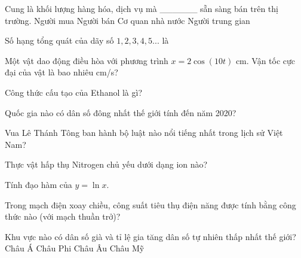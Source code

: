 \begin{ex}
    Cung là khối lượng hàng hóa, dịch vụ mà ______ sẵn sàng bán trên thị trường.
    \choice
    {Người mua}
    {\True Người bán}
    {Cơ quan nhà nước}
    {Người trung gian}
\end{ex}
\begin{ex}
    Số hạng tổng quát của dãy số $1, 2, 3, 4, 5...$ là
\end{ex}
\begin{ex}
    Một vật dao động điều hòa với phương trình $x = 2\cos(10t)$ cm. Vận tốc cực đại của vật là bao nhiêu cm/s?
\end{ex}
\begin{ex}
    Công thức cấu tạo của Ethanol là gì?
\end{ex}
\begin{ex}
    Quốc gia nào có dân số đông nhất thế giới tính đến năm 2020?
\end{ex}
\begin{ex}
    Vua Lê Thánh Tông ban hành bộ luật nào nổi tiếng nhất trong lịch sử Việt Nam?
\end{ex}
\begin{ex}
    Thực vật hấp thụ Nitrogen chủ yếu dưới dạng ion nào?
\end{ex}
\begin{ex}
    Tính đạo hàm của $y = \ln x$.
\end{ex}
\begin{ex}
    Trong mạch điện xoay chiều, công suất tiêu thụ điện năng được tính bằng công thức nào (với mạch thuần trở)?
\end{ex}
\begin{ex}
    Khu vực nào có dân số già và tỉ lệ gia tăng dân số tự nhiên thấp nhất thế giới?
    \choice
    {Châu Á}
    {Châu Phi}
    {\True Châu Âu}
    {Châu Mỹ}
\end{ex}
